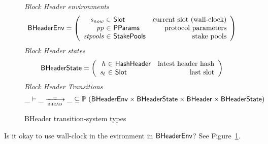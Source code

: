 \begin{figure}
  \emph{Block Header environments}
  \begin{equation*}
    \BHeaderEnv =
    \left(
      \begin{array}{r@{~\in~}lr}
        \var{s_{now}} & \Slot & \text{current slot (wall-clock)} \\
        \var{pp} & \PParams & \text{protocol parameters} \\
        \var{stpools} & \StakePools & \text{stake pools} \\
      \end{array}
    \right)
  \end{equation*}
  \emph{Block Header states}
  \begin{equation*}
    \BHeaderState =
    \left(
      \begin{array}{r@{~\in~}lr}
        \var{h} & \HashHeader & \text{latest header hash} \\
        \var{s_\ell} & \Slot & \text{last slot} \\
      \end{array}
    \right)
  \end{equation*}
  \emph{Block Header Transitions}
  \begin{equation*}
    \_ \vdash \var{\_} \trans{bhead}{\_} \var{\_} \subseteq
    \powerset (\BHeaderEnv \times \BHeaderState \times \BHeader \times \BHeaderState)
  \end{equation*}
  \caption{BHeader transition-system types}
  \label{fig:ts-types:bheader}
\end{figure}

\begin{question}
  Is it okay to use wall-clock in the evironment in $\mathsf{BHeaderEnv}$?
  See Figure~\ref{fig:ts-types:bheader}.
\end{question}

